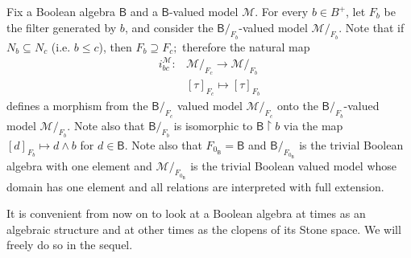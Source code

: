 \documentclass[11pt]{amsart}
\newcommand{\Mod}{\textrm{Mod}}
\newcommand{\LL}{\mathcal{L}}
\newcommand{\F}{\mathcal{F}}
\theoremstyle{plain}
\theoremstyle{definition}
\newtheorem{definition}[theorem]{Definition}
\theoremstyle{plain}
\theoremstyle{remark}
\newcommand{\M}{\mathcal{M}}
\DeclareMathOperator{\St}{St}
\DeclareMathOperator{\CLOP}{\mathsf{CLOP}}
\newcommand{\bool}[1]{\mathsf{#1}}
\newcommand{\0}{\mathsf{0}}
\renewcommand{\1}{\mathsf{1}}
\renewcommand{\2}{\mathsf{2}}
\theoremstyle{definition}
\begin{document}
Fix a Boolean algebra $\bool{B}$ and a $\bool{B}$-valued model $\M$. 
For every $b\in B^+$, let $F_b$ be the filter generated by $b$, and consider 
the $\bool{B}/_{F_b}$-valued model $\M/_{F_b}$.
Note that if $N_b\subseteq N_c$ (i.e. $b\leq c$), then $F_b\supseteq F_c;$ therefore the
natural map 
\begin{align*}
i^\M_{bc}:& \M/_{F_c}\to \M/_{F_b}\\
& [\tau]_{F_c}\mapsto [\tau]_{F_b}
\end{align*}
defines a morphism from the $\bool{B}/_{F_c}$ valued model $\M/_{F_c}$ onto the $\bool{B}/_{F_b}$-valued 
model $\M/_{F_b}$. Note also that $\bool{B}/_{F_b}$ is isomorphic to $\bool{B}\restriction b$ via the map $[d]_{F_b}\mapsto d\wedge b$ for $d\in \bool{B}$.
Note also that $F_{0_\bool{B}}=\bool{B}$ and $\bool{B}/_{F_{0_\bool{B}}}$ is the trivial Boolean algebra with one element and $\M/_{F_{0_\bool{B}}}$ is the trivial Boolean valued model whose domain has one element and all relations are interpreted with full extension.

It is convenient from now on to look at a Boolean algebra at times as an algebraic structure and at other times as the clopens of its Stone space. We will freely do so in the sequel.




\end{document}
